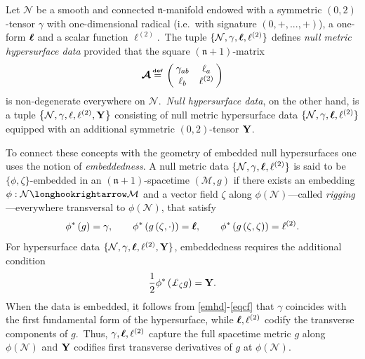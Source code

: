 \documentclass[11pt]{article}
\numberwithin{equation}{section}
\def\defi{{\stackrel{\mbox{\tiny {\textbf{def}}}}{\,\, = \,\, }}}
\def\metdata{\{\mathcal{N},\gamma,\ellc,\elltwo\}}
\def\n{\mathfrak{n}}
\def\bY{\textup{\textbf{Y}}}
\newcommand{\bm}[1]{\mbox{\boldmath $#1$}}
\newcommand\N{\mathcal N}
\newcommand\elltwo{\ell^{(2)}}
\newcommand\hypdata{\{ \mathcal{N},\gamma,\ellc, \elltwo, \bY\}}
\newcommand\rig{\zeta}
\newcommand\A{\mathcal A}
\def\bmell{\bm{\ell}}
\def\ellc{\bmell}
\def\defi{{\stackrel{\mbox{\tiny \textup{\textbf{def}}}}{\,\, = \,\, }}}
\def\metdata{\{\mathcal{N},\gamma,\ellc,\elltwo\}}
\def\n{\mathfrak{n}}
\def\bY{\textup{\textbf{Y}}}
\def\bmell{\bm{\ell}}
\def\ellc{\bmell}
\newcommand{\bs}{\boldsymbol}
\newcommand{\lp}{\left(}
\newcommand{\rp}{\right)}
\newcommand{\lb}{\left\lbrace}
\newcommand{\rb}{\right\rbrace}
\newcommand{\tcte}{}%
\begin{document}
Let $\N$ be a smooth and connected $\n$-manifold endowed with a symmetric $(0,2)$-tensor $ \gamma $ \tcte{with one-dimensional radical (i.e.\ with signature $(0,+,...,+)$)}, a one-form $\ellc$ and a scalar function $\ell^{(2)}$.\ The tuple $\metdata$ defines \textit{null metric hypersurface data} provided that the square $(\n+1)$-matrix
\begin{equation}
	\bs{\A}\defi \lp \hspace{-0.1cm}
	\begin{array}{cc}
		\gamma_{ab} & \ell_a\\
		\ell_b & \elltwo
	\end{array}
	\hspace{-0.1cm}\rp
\end{equation}
is non-degenerate everywhere on $\N$.\ \textit{Null hypersurface data}, on the other hand, is a tuple $\lb \N, \gamma ,\ell,\ell^{(2)},\bY\rb$ consisting of null metric hypersurface data $\metdata$ equipped with an additional symmetric $(0,2)$-tensor $\bY$.

To connect these concepts with the geometry of embedded null hypersurfaces one uses the notion of \textit{embeddedness}. A null metric data $\metdata$ is said to be $\{\phi,\rig\}$-embedded in an $(\n+1)$-spacetime $\lp \mathcal{M},g\rp$ if there exists an embedding $\phi:\N\longhookrightarrow\mathcal{M}$ and
a vector field $\rig$ along $\phi(\N)$---called \textit{rigging}---everywhere transversal to $\phi(\N)$, that satisfy
\begin{equation}
	\label{emhd}
	\phi^*\lp g\rp= \gamma , \qquad\phi^*\lp g\lp\rig,\cdot\rp\rp=\ellc, \qquad\phi^*\lp g\lp\rig,\rig\rp\rp=\ell^{(2)}.
\end{equation}
For hypersurface data $\hypdata$, embeddedness requires the additional condition 
\begin{equation}
	\label{eqcf}
	\dfrac{1}{2}\phi^*\lp \pounds_{\rig}g\rp=\bY.
\end{equation}
When the data is embedded, it follows from \eqref{emhd}-\eqref{eqcf} that $\gamma$ coincides with the first fundamental form of the hypersurface, while $\ellc,\elltwo$ codify the transverse components of $g$.\ Thus, $\gamma,\ellc,\elltwo$ capture the full spacetime metric $g$ along $\phi(\N)$ and $\bY$ codifies first transverse derivatives of $g$ at $\phi(\N)$.
\end{document}
